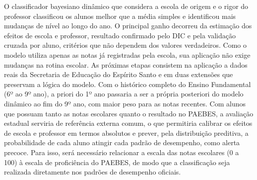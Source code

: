 \documentclass[11pt,a4paper]{article}
\begin{document}
O classificador bayesiano dinâmico que considera a escola de origem e o rigor do professor
classificou os alunos melhor que a média simples e identificou mais mudanças de nível ao longo
do ano. O principal ganho decorreu da estimação dos efeitos de escola e professor, resultado
confirmado pelo DIC e pela validação cruzada por aluno, critérios que não dependem dos valores
verdadeiros. Como o modelo utiliza apenas as notas já registradas pela escola, sua aplicação
não exige mudanças na rotina escolar. As próximas etapas consistem na aplicação a dados reais
da Secretaria de Educação do Espírito Santo e em duas extensões que preservam a lógica do
modelo. Com o histórico completo do Ensino Fundamental (6º ao 9º ano), a priori do 1º ano
passaria a ser a própria posteriori do modelo dinâmico ao fim do 9º ano, com maior peso para as
notas recentes. Com alunos que possuam tanto as notas escolares quanto o resultado no PAEBES, a
avaliação estadual serviria de referência externa comum, o que permitiria calibrar os efeitos
de escola e professor em termos absolutos e prever, pela distribuição preditiva, a
probabilidade de cada aluno atingir cada padrão de desempenho, como alerta precoce. Para isso,
será necessário relacionar a escala das notas escolares (0 a 100) à escala de proficiência do
PAEBES, de modo que a classificação seja realizada diretamente nos padrões de desempenho
oficiais.
\end{document}
